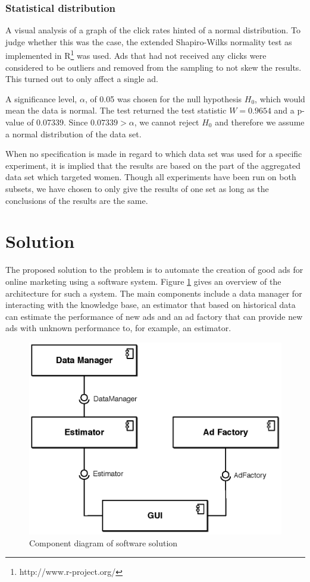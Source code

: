 \documentclass{sig-alternate}
\begin{document}
\subsubsection{Statistical distribution}
A visual analysis of a graph of the click rates hinted of a normal distribution. To judge whether this was the case, the extended Shapiro-Wilks normality test \citep{Royston1982} as implemented in R\footnote{http://www.r-project.org/} was used. Ads that had not received any clicks were considered to be outliers and removed from the sampling to not skew the results. This turned out to only affect a single ad.

A significance level, \(\alpha\), of 0.05 was chosen for the null hypothesis \(H_0\), which would mean the data is normal. The test returned the test statistic \(W = 0.9654\) and a p-value of 0.07339. Since \(0.07339 > \alpha\), we cannot reject \(H_0\) and therefore we assume a normal distribution of the data set.

When no specification is made in regard to which data set was used for a specific experiment, it is implied that the results are based on the part of the aggregated data set which targeted women. Though all experiments have been run on both subsets, we have chosen to only give the results of one set as long as the conclusions of the results are the same.

\section{Solution}
\label{ch:Solution}
The proposed solution to the problem is to automate the creation of good ads for online marketing using a software system. Figure \ref{fig:SWArchitecture} gives an overview of the architecture for such a system. The main components include a data manager for interacting with the knowledge base, an estimator that based on historical data can estimate the performance of new ads and an ad factory that can provide new ads with unknown performance to, for example, an estimator.

\begin{figure}[htb]
	\centering
	\includegraphics[width=\columnwidth]{sw-architecture.eps}
	\caption{Component diagram of software solution}
	\label{fig:SWArchitecture}
\end{figure}
\end{document}
